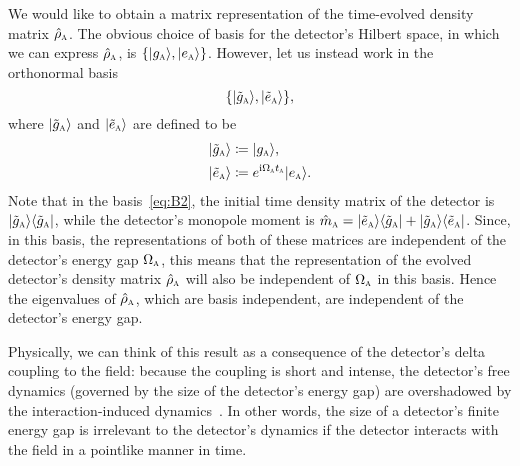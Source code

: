 \documentclass[pra,nofootinbib,floats,aps,twocolumn,tightenlines,superscriptaddress]{revtex4-1}
\newcommand{\ket}[1]{| {#1} \rangle}
\newcommand{\bra}[1]{\langle {#1} |}
\newcommand{\ii}{\mathrm{i}}
\newcommand{\rhoa}{\hat{\rho}_\textsc{a}}
\newcommand{\ma}{\hat{m}_\textsc{a}}
\newcommand{\gak}{\ket{\tilde{g}_\textsc{a}}}
\newcommand{\eak}{\ket{\tilde{e}_\textsc{a}}}
\newcommand{\gab}{\bra{\tilde{g}_\textsc{a}}}
\newcommand{\eab}{\bra{\tilde{e}_\textsc{a}}}
\begin{document}
We would like to obtain a matrix representation of the time-evolved density matrix $\rhoa$. The obvious choice of basis for the detector's Hilbert space, in which we can express $\rhoa$, is \mbox{$\{\ket{g_\textsc{a}},\ket{e_\textsc{a}}\}$}. However, let us instead work in the orthonormal basis
\begin{equation}
\label{eq:B2}
    \{\ket{\tilde{g}_\textsc{a}},\ket{\tilde{e}_\textsc{a}}\},
\end{equation} 
where $\gak$ and $\eak$ are defined to be
\begin{align}
    \label{eq:gak}
    \ket{\tilde{g}_\textsc{a}}
    &\coloneqq
    \ket{g_\textsc{a}},
    \\
    \label{eq:eak}
    \ket{\tilde{e}_\textsc{a}}
    &\coloneqq
    e^{\ii\Omega_\textsc{a}t_\textsc{a}}
    \ket{e_\textsc{a}}.
\end{align}
Note that in the basis~\eqref{eq:B2}, the initial time density matrix of the detector is $\ket{\tilde{g}_\textsc{a}}\bra{\tilde{g}_\textsc{a}}$, while the detector's monopole moment is \mbox{$\ma=\eak\gab+\gak\eab$}. Since, in this basis, the representations of both of these matrices are independent of the detector's energy gap $\Omega_\textsc{a}$, this means that the representation of the evolved detector's density matrix $\rhoa$ will also be independent of $\Omega_\textsc{a}$ in this basis. Hence the eigenvalues of $\rhoa$, which are basis independent, are independent of the detector's energy gap.

Physically, we can think of this result as a consequence of the detector's delta coupling to the field: because the coupling is short and intense, the detector's free dynamics (governed by the size of the detector's energy gap) are overshadowed by the interaction-induced dynamics~\cite{Pozas2017}. In other words, the size of a detector's finite energy gap is irrelevant to the detector's dynamics if the detector interacts with the field in a pointlike manner in time.
\end{document}
